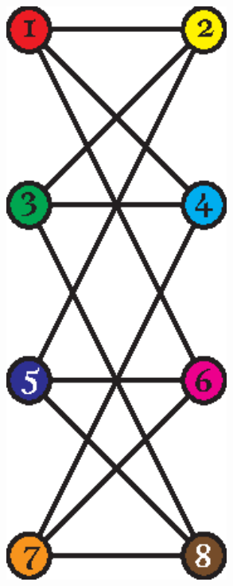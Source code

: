       \begin{table}[H]
        \centering
        \begin{minipage}[b]{0.3\textwidth}
          \centering
          \includegraphics[width=0.55\textwidth]{chapters/02_problem_definition/isomorphism_1}
        \end{minipage}
        \quad
        \begin{minipage}[b]{0.3\textwidth}
          \centering

\end{minipage}
\end{table}

